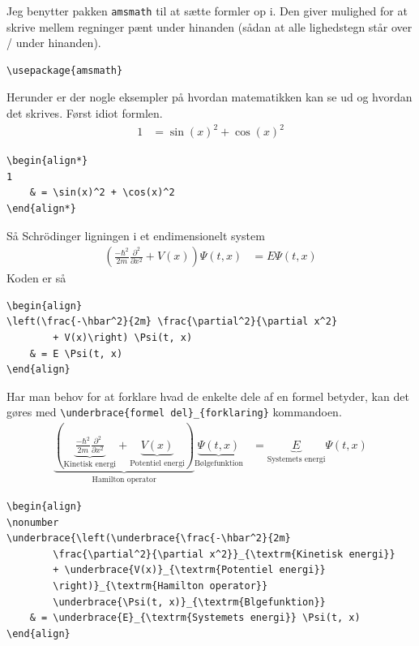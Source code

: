 \documentclass[11pt,a4paper,fleqn]{article}
\numberwithin{equation}{section}
\begin{document}
Jeg benytter pakken \verb!amsmath! til at sætte formler op i. 
Den giver mulighed for at skrive mellem regninger pænt under
hinanden (sådan at alle lighedstegn står over / under hinanden).
%
\begin{lstlisting}
\usepackage{amsmath}
\end{lstlisting}
%
Herunder er der nogle eksempler på hvordan matematikken kan se ud og
hvordan det skrives.
Først idiot formlen.
%
\begin{align*}
1
	& = \sin(x)^2 + \cos(x)^2 
\end{align*}
%
\begin{lstlisting}
\begin{align*}
1
	& = \sin(x)^2 + \cos(x)^2 
\end{align*}
\end{lstlisting}
%
Så Schrödinger ligningen i et endimensionelt system 
%
\begin{align}
\left(\frac{-\hbar^2}{2m} \frac{\partial^2}{\partial x^2} 
		+ V(x)\right) \Psi(t, x)
	& = E \Psi(t, x)
\end{align}
%
Koden er så
%
\begin{lstlisting}
\begin{align}
\left(\frac{-\hbar^2}{2m} \frac{\partial^2}{\partial x^2} 
		+ V(x)\right) \Psi(t, x)
	& = E \Psi(t, x)
\end{align}
\end{lstlisting}
%
Har man behov for at forklare hvad de enkelte dele af en formel
betyder, kan det gøres med 
\verb!\underbrace{formel del}_{forklaring}! kommandoen.
%
\begin{align}
\nonumber
\underbrace{\left(\underbrace{\frac{-\hbar^2}{2m} 
		\frac{\partial^2}{\partial x^2}}_{\textrm{Kinetisk energi}} 
		+ \underbrace{V(x)}_{\textrm{Potentiel energi}}
		\right)}_{\textrm{Hamilton operator}}
		\underbrace{\Psi(t, x)}_{\textrm{Bølgefunktion}}
	& = \underbrace{E}_{\textrm{Systemets energi}} \Psi(t, x)
\end{align}
%
\begin{lstlisting}
\begin{align}
\nonumber
\underbrace{\left(\underbrace{\frac{-\hbar^2}{2m} 
		\frac{\partial^2}{\partial x^2}}_{\textrm{Kinetisk energi}} 
		+ \underbrace{V(x)}_{\textrm{Potentiel energi}}
		\right)}_{\textrm{Hamilton operator}}
		\underbrace{\Psi(t, x)}_{\textrm{Blgefunktion}}
	& = \underbrace{E}_{\textrm{Systemets energi}} \Psi(t, x)
\end{align}
\end{lstlisting}



\end{document}
